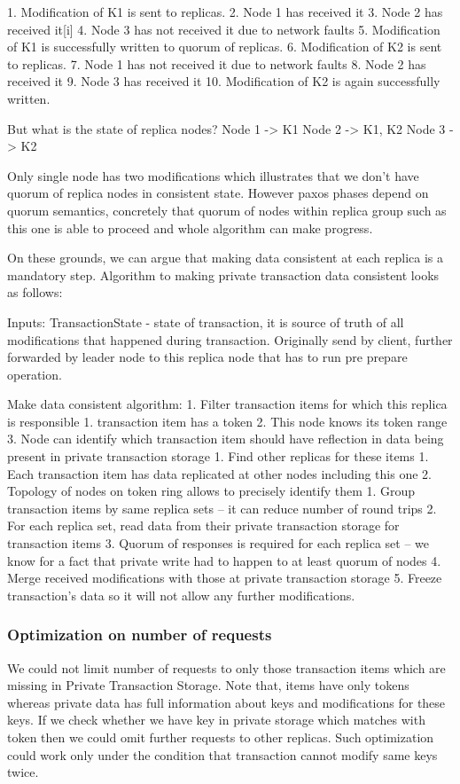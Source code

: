 1. Modification of K1 is sent to replicas.
2. Node 1 has received it
3. Node 2 has received it[i]
4. Node 3 has not received it due to network faults
5. Modification of K1 is successfully written to quorum of replicas.
6. Modification of K2 is sent to replicas.
7. Node 1 has not received it due to network faults
8. Node 2 has received it
9. Node 3 has received it
10. Modification of K2 is again successfully written.


But what is the state of replica nodes?
Node 1 -> { K1 }
Node 2 -> { K1, K2 }
Node 3 -> { K2 }


Only single node has two modifications which illustrates that we don’t have quorum of replica nodes in consistent state. However paxos phases depend on quorum semantics, concretely that quorum of nodes within replica group such as this one is able to proceed and whole algorithm can make progress. 


On these grounds, we can argue that making data consistent at each replica is a mandatory step.
Algorithm to making private transaction data consistent looks as follows:


Inputs:
        TransactionState - state of transaction, it is source of truth of all modifications that happened during transaction. Originally send by client, further forwarded by leader node to this replica node that has to run pre prepare operation.


        Make data consistent algorithm:        
1. Filter transaction items for which this replica is responsible
   1. transaction item has a token
   2. This node knows its token range
   3. Node can identify which transaction item should have reflection in data being present in private transaction storage
1. Find other replicas for these items
   1. Each transaction item has data replicated at other nodes including this one
   2. Topology of nodes on token ring allows to precisely identify them
1. Group transaction items by same replica sets -- it can reduce number of round trips
2. For each replica set, read data from their private transaction storage for transaction items
3. Quorum of responses is required for each replica set -- we know for a fact that private write had to happen to at least quorum of nodes
4. Merge received modifications with those at private transaction storage
5. Freeze transaction’s data so it will not allow any further modifications.


\subsubsection{Optimization on number of requests}
We could not limit number of requests to only those transaction items which are missing in Private Transaction Storage. Note that, items have only tokens whereas private data has full information about keys and modifications for these keys. If we check whether we have key in private storage which matches with token then we could omit further requests to other replicas. 
Such optimization could work only under the condition that transaction cannot modify same keys twice. 



